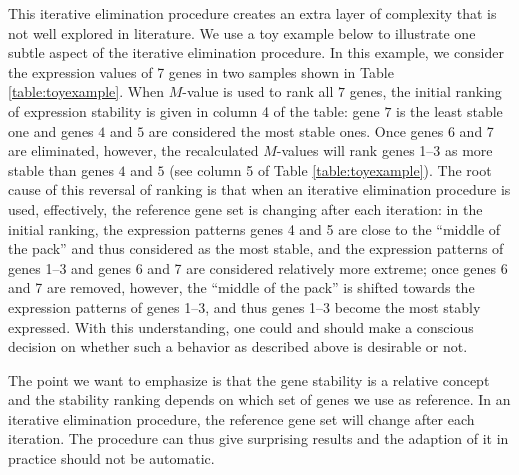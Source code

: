 \documentclass[letterpaper,12pt]{article}
\begin{document}
This iterative elimination procedure creates an extra layer of complexity that
is not well explored in literature. We use a toy example below to illustrate
one subtle aspect of the iterative elimination procedure.  In this example, we
consider the expression values of 7 genes in two samples shown in Table
\ref{table:toyexample}. When $M$-value is used to rank all $7$ genes, the
initial ranking of expression stability is given in column 4 of the table:
gene $7$ is the least stable one and genes $4$ and $5$ are considered the most
stable ones.  Once genes 6 and 7 are eliminated, however, the recalculated
$M$-values will rank genes 1--3 as more stable than genes $4$ and
$5$ (see column 5 of Table \ref{table:toyexample}). The root cause of this
reversal of ranking is that when an iterative elimination procedure is used,
effectively, the reference gene set is changing after each iteration: in the
initial ranking, the expression patterns genes 4 and 5 are close to the
``middle of the pack'' and thus considered as the most stable, and the
expression patterns of genes 1--3 and genes 6 and 7 are considered relatively
more extreme; once genes 6 and 7 are removed, however, the ``middle of the
pack'' is shifted towards the expression patterns of genes 1--3, and thus
genes 1--3 become the most stably expressed.  With this understanding, one
could and should make a conscious decision on whether such a behavior as
described above is desirable or not.  

The point we want to emphasize is that the gene stability is a relative concept
and the stability ranking depends on which set of genes we use as reference.
In an iterative elimination procedure, the reference gene set will change
after each iteration. The procedure can thus give surprising results and the
adaption of it in practice should not be automatic.
\end{document}

